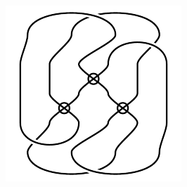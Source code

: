 \begin{figure}[H]
\begin{minipage}[b]{.18\linewidth}
\end{minipage}
\begin{minipage}[b]{.18\linewidth}
\centering
\includegraphics[width=\linewidth]{../data/virtual_4_71.png}
\end{minipage}
\end{figure}

